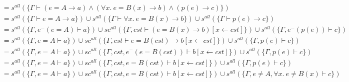 \documentclass[12pt]{article}
\begin{document}
\begin{align*}
          & = s^{all} (\{\Gamma \vdash (e = A \rightarrow a ) \land (\forall x.~ e = B(x) \rightarrow b ) \land (p(e) \rightarrow c )\})                                                                       \\
          & = s^{all} (\{\Gamma \vdash e = A \rightarrow a\}) \cup s^{all} (\{\Gamma \vdash \forall x.~ e = B(x) \rightarrow b \}) \cup s^{all} (\{\Gamma \vdash p(e) \rightarrow c \})                        \\
          & = s^{all} (\{\Gamma, e^- (e = A) \vdash a\}) \cup sc^{all} (\{\Gamma, cst\vdash (e = B(x) \rightarrow b)[x\leftarrow cst]\}) \cup s^{all} (\{\Gamma, e^-(p(e)) \vdash c \})                        \\
          & = s^{all} (\{\Gamma, e = A \vdash a\}) \cup sc^{all} (\{\Gamma, cst\vdash e = B(cst) \rightarrow b[x\leftarrow cst]\}) \cup s^{all} (\{\Gamma, p(e) \vdash c \})                                   \\
          & = s^{all} (\{\Gamma, e = A \vdash a\}) \cup sc^{all} (\{\Gamma, cst, e^-(e = B(cst)) \vdash b[x\leftarrow cst]\}) \cup s^{all} (\{\Gamma, p(e) \vdash c \})                                        \\
          & = s^{all} (\{\Gamma, e = A \vdash a\}) \cup sc^{all} (\{\Gamma, cst, e = B(cst) \vdash b[x\leftarrow cst]\}) \cup s^{all} (\{\Gamma, p(e) \vdash c \})                                             \\
          & = s^{all} (\{\Gamma, e = A \vdash a\}) \cup sc^{all} (\{\Gamma, cst, e = B(cst) \vdash b[x\leftarrow cst]\}) \cup s^{all} (\{\Gamma, e \neq A, \forall x.~ e \neq B(x) \vdash c \})                \\
\end{align*}
\end{document}
